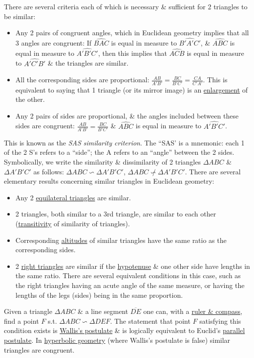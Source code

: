 \documentclass{article}
\begin{document}
There are several criteria each of which is necessary \& sufficient for 2 triangles to be similar:
\begin{itemize}
	\item Any 2 pairs of congruent angles, which in Euclidean geometry implies that all 3 angles are congruent: If $\widehat{BAC}$ is equal in measure to $\widehat{B'A'C'}$, \& $\widehat{ABC}$ is equal in measure to $\widehat{A'B'C'}$, then this implies that $\widehat{ACB}$ is equal in measure to $\widehat{A'C'B'}$ \& the triangles are similar.
	\item All the corresponding sides are proportional: $\frac{AB}{A'B'} = \frac{BC}{B'C'} = \frac{CA}{C'A'}$. This is equivalent to saying that 1 triangle (or its mirror image) is an \href{https://en.wikipedia.org/wiki/Homothetic_transformation}{enlargement} of the other.
	\item Any 2 pairs of sides are proportional, \& the angles included between these sides are congruent: $\frac{AB}{A'B'} = \frac{BC}{B'C'}$ \& $\widehat{ABC}$ is equal in measure to $\widehat{A'B'C'}$.
\end{itemize}
This is known as the \textit{SAS similarity criterion}. The ``SAS' is a mnemonic: each 1 of the 2 S's refers to a ``side''; the A refers to an ``angle'' between the 2 sides. Symbolically, we write the similarity \& dissimilarity of 2 triangles $\Delta ABC$ \& $\Delta A'B'C'$ as follows: $\Delta ABC\backsim\Delta A'B'C'$, $\Delta ABC\not\backsim\Delta A'B'C'$. There are several elementary results concerning similar triangles in Euclidean geometry:
\begin{itemize}
	\item Any 2 \href{https://en.wikipedia.org/wiki/Equilateral_triangle}{equilateral triangles} are similar.
	\item 2 triangles, both similar to a 3rd triangle, are similar to each other (\href{https://en.wikipedia.org/wiki/Transitive_relation}{transitivity} of similarity of triangles).
	\item Corresponding \href{https://en.wikipedia.org/wiki/Altitude_(triangle)}{altitudes} of similar triangles have the same ratio as the corresponding sides.
	\item 2 \href{https://en.wikipedia.org/wiki/Right_triangle}{right triangles} are similar if the \href{https://en.wikipedia.org/wiki/Hypotenuse}{hypotenuse} \& one other side have lengths in the same ratio. There are several equivalent conditions in this case, such as the right triangles having an acute angle of the same measure, or having the lengths of the legs (sides) being in the same proportion.
\end{itemize}
Given a triangle $\Delta ABC$ \& a line segment $\overline{DE}$ one can, with a \href{https://en.wikipedia.org/wiki/Straightedge_and_compass_construction}{ruler \& compass}, find a point $F$ s.t. $\Delta ABC\backsim\Delta DEF$. The statement that point $F$ satisfying this condition exists is \href{https://en.wikipedia.org/wiki/John_Wallis#Geometry}{Wallis's postulate} \& is logically equivalent to Euclid's \href{https://en.wikipedia.org/wiki/Parallel_postulate}{parallel postulate}. In \href{https://en.wikipedia.org/wiki/Hyperbolic_geometry}{hyperbolic geometry} (where Wallis's postulate is false) similar triangles are congruent.
\end{document}
